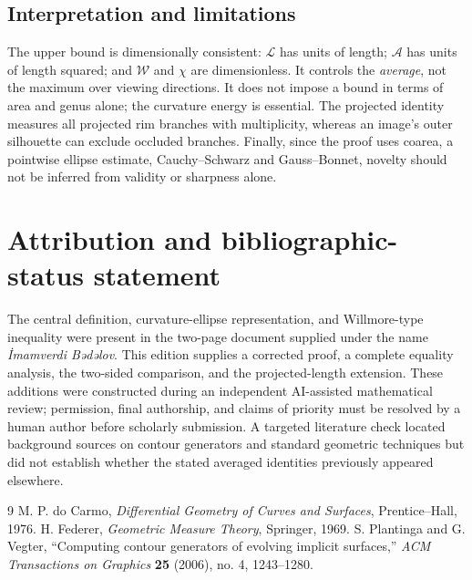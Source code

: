 \documentclass[10pt,a4paper]{article}
\theoremstyle{remark}\newtheorem{remark}[theorem]{Remark}
\newcommand{\A}{\mathcal A}
\newcommand{\W}{\mathcal W}
\newcommand{\Lc}{\mathcal L}
\begin{document}
\subsection*{Interpretation and limitations}
The upper bound is dimensionally consistent: $\Lc$ has units of length; $\A$ has units of length squared; and $\W$ and $\chi$ are dimensionless. It controls the \emph{average}, not the maximum over viewing directions. It does not impose a bound in terms of area and genus alone; the curvature energy is essential. The projected identity measures all projected rim branches with multiplicity, whereas an image's outer silhouette can exclude occluded branches. Finally, since the proof uses coarea, a pointwise ellipse estimate, Cauchy--Schwarz and Gauss--Bonnet, novelty should not be inferred from validity or sharpness alone.

\section*{Attribution and bibliographic-status statement}
The central definition, curvature-ellipse representation, and Willmore-type inequality were present in the two-page document supplied under the name \emph{İmamverdi Bədəlov}. This edition supplies a corrected proof, a complete equality analysis, the two-sided comparison, and the projected-length extension. These additions were constructed during an independent AI-assisted mathematical review; permission, final authorship, and claims of priority must be resolved by a human author before scholarly submission. A targeted literature check located background sources on contour generators and standard geometric techniques but did not establish whether the stated averaged identities previously appeared elsewhere.

\begin{thebibliography}{9}\setlength{\itemsep}{2pt}
 M. P. do Carmo, \emph{Differential Geometry of Curves and Surfaces}, Prentice--Hall, 1976.
 H. Federer, \emph{Geometric Measure Theory}, Springer, 1969.
 S. Plantinga and G. Vegter, ``Computing contour generators of evolving implicit surfaces,'' \emph{ACM Transactions on Graphics} \textbf{25} (2006), no. 4, 1243--1280.
\end{thebibliography}
\end{document}
